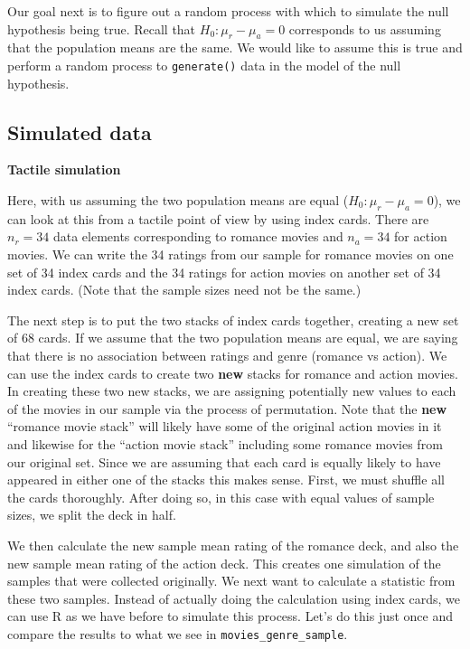 \documentclass[12pt, krantz2,]{krantz}
\begin{document}
Our goal next is to figure out a random process with which to simulate the null hypothesis being true. Recall that \(H_0: \mu_r - \mu_a = 0\) corresponds to us assuming that the population means are the same. We would like to assume this is true and perform a random process to \texttt{generate()} data in the model of the null hypothesis.

\hypertarget{simulated-data}{%
\subsection{Simulated data}\label{simulated-data}}

\textbf{Tactile simulation}

Here, with us assuming the two population means are equal (\(H_0: \mu_r - \mu_a = 0\)), we can look at this from a tactile point of view by using index cards. There are \(n_r = 34\) data elements corresponding to romance movies and \(n_a = 34\) for action movies. We can write the 34 ratings from our sample for romance movies on one set of 34 index cards and the 34 ratings for action movies on another set of 34 index cards. (Note that the sample sizes need not be the same.)

The next step is to put the two stacks of index cards together, creating a new set of 68 cards. If we assume that the two population means are equal, we are saying that there is no association between ratings and genre (romance vs action). We can use the index cards to create two \textbf{new} stacks for romance and action movies. In creating these two new stacks, we are assigning potentially new values to each of the movies in our sample via the process of permutation. Note that the \textbf{new} ``romance movie stack'' will likely have some of the original action movies in it and likewise for the ``action movie stack'' including some romance movies from our original set. Since we are assuming that each card is equally likely to have appeared in either one of the stacks this makes sense. First, we must shuffle all the cards thoroughly. After doing so, in this case with equal values of sample sizes, we split the deck in half.

We then calculate the new sample mean rating of the romance deck, and also the new sample mean rating of the action deck. This creates one simulation of the samples that were collected originally. We next want to calculate a statistic from these two samples. Instead of actually doing the calculation using index cards, we can use R as we have before to simulate this process. Let's do this just once and compare the results to what we see in \texttt{movies\_genre\_sample}.
\end{document}
